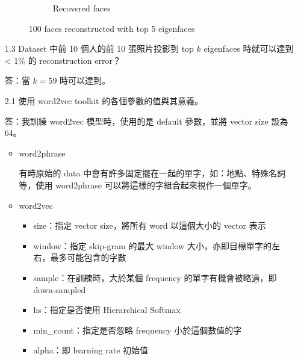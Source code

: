 \documentclass[12pt,a4paper]{extarticle}
\begin{document}
\begin{itemize}
\begin{figure}[ht]
\begin{subfigure}[t]{0.5\textwidth}
      \caption{Recovered faces}
      \label{fig:recovered-faces}
    \end{subfigure}
    \caption{100 faces reconstructed with top 5 eigenfaces}
    \label{fig:reconstruct-with-eigenfaces}
  \end{figure}

  \item[1.3] Dataset 中前 10 個人的前 10 張照片投影到 top $k$ eigenfaces 時就可以達到 < 1\% 的 reconstruction error？
  \par 答：當 $k = 59$ 時可以達到。


  \item[2.1] 使用 word2vec toolkit 的各個參數的值與其意義。
  \par 答：我訓練 word2vec 模型時，使用的是 default 參數，並將 vector size 設為 64。
  \begin{itemize}
    \item word2phrase
    \par 有時原始的 data 中會有許多固定擺在一起的單字，如：地點、特殊名詞等，使用 word2phrase 可以將這樣的字組合起來視作一個單字。
    \item word2vec
    \begin{itemize}
      \item size：指定 vector size，將所有 word 以這個大小的 vector 表示
      \item window：指定 skip-gram 的最大 window 大小，亦即目標單字的左右，最多可能包含的字數
      \item sample：在訓練時，大於某個 frequency 的單字有機會被略過，即 down-sampled
      \item hs：指定是否使用 Hierarchical Softmax
      \item min\_count：指定是否忽略 frequency 小於這個數值的字
      \item alpha：即 learning rate 初始值
    \end{itemize}
  \end{itemize}


\end{itemize}
\end{document}
